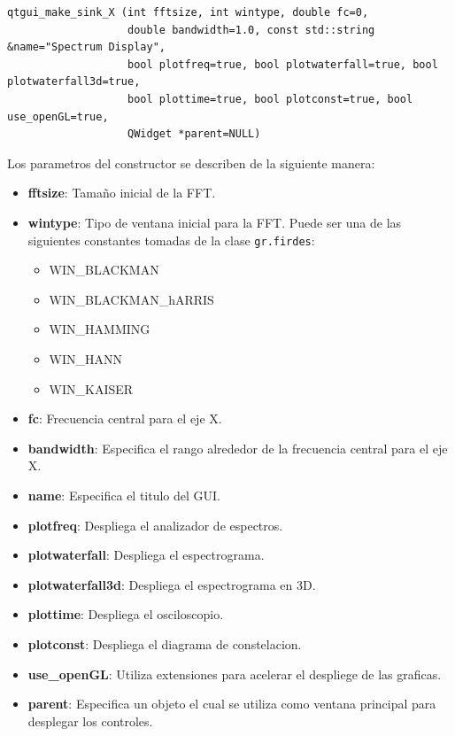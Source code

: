 \begin{lstlisting}[float, label=ex:qtguiconst, caption={Constructor de los bloques qtgui\_sink\_x},
breaklines=true, language={[ISO]C++}]
qtgui_make_sink_X (int fftsize, int wintype, double fc=0, 
                   double bandwidth=1.0, const std::string &name="Spectrum Display",
                   bool plotfreq=true, bool plotwaterfall=true, bool plotwaterfall3d=true,
                   bool plottime=true, bool plotconst=true, bool use_openGL=true,
                   QWidget *parent=NULL)
\end{lstlisting}

Los parametros del constructor se describen de la siguiente manera:

\begin{itemize}
  \item \textbf{fftsize}: Tama\~no inicial de la FFT.
  \item \textbf{wintype}: Tipo de ventana inicial para la FFT. Puede ser una de las siguientes
  constantes tomadas de la clase \verb|gr.firdes|:
  \begin{itemize}
    \item WIN\_BLACKMAN 
    \item WIN\_BLACKMAN\_hARRIS
    \item WIN\_HAMMING
    \item WIN\_HANN 
    \item WIN\_KAISER
  \end{itemize}
  \item \textbf{fc}: Frecuencia central para el eje X.
  \item \textbf{bandwidth}: Especifica el rango alrededor de la frecuencia central para el eje X.
  \item \textbf{name}: Especifica el titulo del GUI.
  \item \textbf{plotfreq}: Despliega el analizador de espectros.
  \item \textbf{plotwaterfall}: Despliega el espectrograma.
  \item \textbf{plotwaterfall3d}: Despliega el espectrograma en 3D.
  \item \textbf{plottime}: Despliega el osciloscopio.
  \item \textbf{plotconst}: Despliega el diagrama de constelacion.
  \item \textbf{use\_openGL}: Utiliza extensiones para acelerar el despliege de las graficas.
  \item \textbf{parent}: Especifica un objeto el cual se utiliza como ventana principal para
  desplegar los controles.
\end{itemize}

